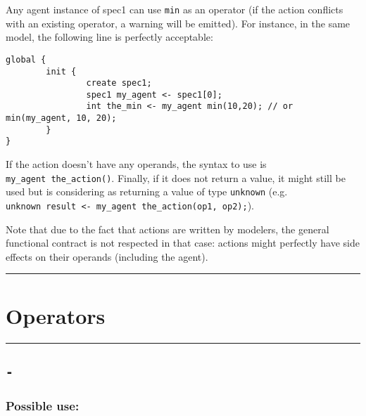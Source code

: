 \documentclass[]{book}
\theoremstyle{definition}
\theoremstyle{definition}
\theoremstyle{definition}
\theoremstyle{remark}
\begin{document}
Any agent instance of spec1 can use \texttt{min} as an operator (if the
action conflicts with an existing operator, a warning will be emitted).
For instance, in the same model, the following line is perfectly
acceptable:

\begin{verbatim}
global {
        init {
                create spec1;
                spec1 my_agent <- spec1[0];
                int the_min <- my_agent min(10,20); // or min(my_agent, 10, 20);
        }
}
\end{verbatim}

If the action doesn't have any operands, the syntax to use is
\texttt{my\_agent\ the\_action()}. Finally, if it does not return a
value, it might still be used but is considering as returning a value of
type \texttt{unknown} (e.g.
\texttt{unknown\ result\ \textless{}-\ my\_agent\ the\_action(op1,\ op2);}).

Note that due to the fact that actions are written by modelers, the
general functional contract is not respected in that case: actions might
perfectly have side effects on their operands (including the agent).

\begin{center}\rule{0.5\linewidth}{\linethickness}\end{center}

\section{Operators}\label{operators}

\begin{center}\rule{0.5\linewidth}{\linethickness}\end{center}

\subsection{\texorpdfstring{\texttt{-}}{-}}\label{section-1}

\subsubsection{Possible use:}\label{possible-use}
\end{document}
